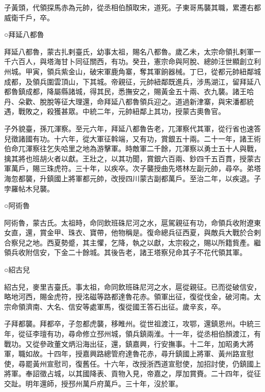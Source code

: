 \begin{pinyinscope}
 子黃頭，代領探馬赤為元帥，從丞相伯顏取宋，道死。子東哥馬襲其職，累遷右都威衛千戶，卒。



 ○拜延八都魯



 拜延八都魯，蒙古扎剌臺氏，幼事太祖，賜名八都魯。歲乙未，太宗命領扎剌軍一千六百人，與塔海甘卜同征關西，有功。癸丑，憲宗命與阿脫、總帥汪世顯創立利州城。甲寅，領兵紫金山，破宋軍鹿角寨，奪其軍餉器械。丁巳，從都元帥紐鄰城成都，及領兵圍雲頂山，下其城。帝親征，元帥紐鄰既進兵，涉馬湖江，留拜延八都魯鎮成都，降屬縣諸城，得其民，悉撫安之，賜黃金五十兩、衣九襲。諸王哈丹、朵歡、脫脫等征大理還，命拜延八都魯領兵迎之。道過新津寨，與宋潘都統遇，戰敗之，殺獲甚眾。中統二年，元帥紐鄰上其功，授蒙古奧魯官。



 子外貌臺，孫兀渾察。至元六年，拜延八都魯告老，兀渾察代其軍，從行省也速答兒徵諸國有功。十六年，從大軍征斡端，又有功，賞銀五十兩。二十一年，諸王術伯命兀渾察往乞失哈里之地為游擊軍。時敵軍二千餘，兀渾察以勇士五十人與戰，擒其將也班胡火者以獻。王壯之，以其功聞，賞銀六百兩、鈔四千五百貫，授蒙古軍萬戶，賜三珠虎符。三十年，以疾卒。次子襲授曲先塔林左副元帥，尋卒。弟塔海忽都襲，升鎮國上將軍都元帥，改授四川蒙古副都萬戶。至治二年，以疾退。子孛羅帖木兒襲。



 ○阿術魯



 阿術魯，蒙古氏。太祖時，命同飲班硃尼河之水，扈駕親征有功，命領兵收附遼東女直，還，賞金甲、珠衣、寶帶，他物稱是。復命總兵征西夏，與敵兵大戰於合剌合察兒之地。西夏勢蹙，其主懼，乞降，執之以獻，太宗殺之，賜以所籍貲產。繼領兵收附信安，下金二十餘城。其後告老，諸王塔察兒命其子不花代領其軍。



 ○紹古兒



 紹古兒，麥里吉臺氏。事太祖，命同飲班硃尼河之水，扈從親征。已而從破信安，略地河西，賜金虎符，授洺磁等路都達魯花赤。領軍出征，復從伐金，破河南。太宗命領濟南、大名、信安等處軍馬，復從國王答石出征。歲辛亥，卒。



 子拜都襲。拜都卒，子忽都虎襲，移睢州。從世祖渡江，攻鄂，還鎮恩州。中統三年，從征李璮有功，尋命修立邳州城，領兵鎮兩淮。十一年，從丞相伯顏渡江，有戰功。又從參政董文炳沿海出征，還，鎮嘉興，行安撫事。十二年，加昭勇大將軍，職如故。十四年，授嘉興路總管府達魯花赤，尋升鎮國上將軍、黃州路宣慰使，尋罷黃州宣慰司，復舊任。十六年，改授浙西道宣慰使，加招討使，仍鎮國上將軍。奉詔徵占城，以其國降表、貢物入見，帝嘉之，厚加賞賚。二十四年，從征交趾。明年還師，授邳州萬戶府萬戶。三十年，沒於軍。




\end{pinyinscope}
